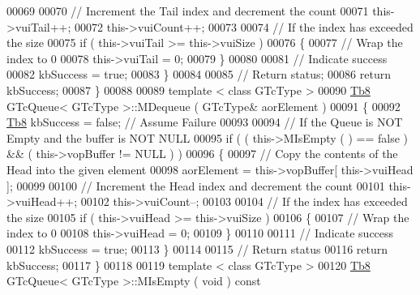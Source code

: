 \begin{DoxyCode}
00069 
00070             \textcolor{comment}{// Increment the Tail index and decrement the count}
00071             this->vuiTail++;
00072             this->vuiCount++;
00073 
00074             \textcolor{comment}{// If the index has exceeded the size}
00075             \textcolor{keywordflow}{if} ( this->vuiTail >= this->vuiSize )
00076             \{
00077                \textcolor{comment}{// Wrap the index to 0}
00078                this->vuiTail = 0;
00079             \}
00080 
00081             \textcolor{comment}{// Indicate success}
00082             kbSuccess = \textcolor{keyword}{true};
00083          \}
00084 
00085          \textcolor{comment}{// Return status;}
00086          \textcolor{keywordflow}{return} kbSuccess;
00087       \}
00088 
00089       \textcolor{keyword}{template} < \textcolor{keyword}{class} GTcType >
00090       \mbox{\hyperlink{namespace_g_n_common_a8115dc7ed53b6e5b52e6bfde1632ea74}{Tb8}} GTcQueue< GTcType >::MDequeue ( GTcType& aorElement )
00091       \{
00092          \mbox{\hyperlink{namespace_g_n_common_a8115dc7ed53b6e5b52e6bfde1632ea74}{Tb8}} kbSuccess = \textcolor{keyword}{false}; \textcolor{comment}{// Assume Failure}
00093 
00094          \textcolor{comment}{// If the Queue is NOT Empty and the buffer is NOT NULL}
00095          \textcolor{keywordflow}{if} ( ( this->MIsEmpty ( ) == \textcolor{keyword}{false} ) && ( this->vopBuffer != NULL ) )
00096          \{
00097             \textcolor{comment}{// Copy the contents of the Head into the given element}
00098             aorElement = this->vopBuffer[ this->vuiHead ];
00099 
00100             \textcolor{comment}{// Increment the Head index and decrement the count}
00101             this->vuiHead++;
00102             this->vuiCount--;
00103 
00104             \textcolor{comment}{// If the index has exceeded the size}
00105             \textcolor{keywordflow}{if} ( this->vuiHead >= this->vuiSize )
00106             \{
00107                \textcolor{comment}{// Wrap the index to 0}
00108                this->vuiHead = 0;
00109             \}
00110 
00111             \textcolor{comment}{// Indicate success}
00112             kbSuccess = \textcolor{keyword}{true};
00113          \}
00114 
00115          \textcolor{comment}{// Return status}
00116          \textcolor{keywordflow}{return} kbSuccess;
00117       \}
00118 
00119       \textcolor{keyword}{template} < \textcolor{keyword}{class} GTcType >
00120       \mbox{\hyperlink{namespace_g_n_common_a8115dc7ed53b6e5b52e6bfde1632ea74}{Tb8}} GTcQueue< GTcType >::MIsEmpty ( \textcolor{keywordtype}{void} )\textcolor{keyword}{ const}

\end{DoxyCode}
